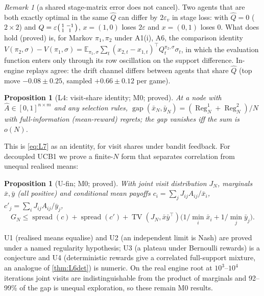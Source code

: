\documentclass[10pt]{article}
\theoremstyle{plain}
\newtheorem{proposition}[theorem]{Proposition}
\theoremstyle{definition}
\theoremstyle{remark}
\newtheorem{remark}[theorem]{Remark}
\newcommand{\E}{\mathbb{E}}
\DeclareMathOperator{\TV}{TV}
\DeclareMathOperator{\spread}{spread}
\DeclareMathOperator{\Reg}{Reg}
\DeclareMathOperator{\NashGap}{gap}
\newcommand{\epsv}{\varepsilon_v}
\newcommand{\Qhat}{\hat Q}
\newcommand{\Ahat}{\hat A}
\begin{document}
\begin{remark}[a shared stage-matrix error does not cancel]\label{rem:nocancel}
Two agents that are both exactly optimal in the same $\Qhat$ can differ by $2\epsv$ in stage loss: with $\Qhat=0$ ($2\times2$)
and $Q=\varepsilon\begin{psmallmatrix}1&-1\\1&1\end{psmallmatrix}$, $x=(1,0)$ loses $2\varepsilon$ and $x=(0,1)$ loses 0. What does
hold (proved) is, for Markov $\pi_1,\pi_2$ under A1(i), A6, the comparison identity $V(\pi_2,\sigma)-V(\pi_1,\sigma)=\E_{\pi_1,\sigma}\sum_t(x_{2,t}-x_{1,t})^\top Q^{\pi_2,\sigma}_t\sigma_t$,
in which the evaluation function enters only through its row oscillation on the support difference. In-engine replays agree: the drift
channel differs between agents that share $\Qhat$ (top move $-0.08\pm0.25$, sampled $+0.66\pm0.12$ per game).
\end{remark}

\begin{proposition}[L4: visit-share identity; M0; proved]\label{prop:L4}
At a node with $\Ahat\in[0,1]^{n\times m}$ and any selection rules,
$\NashGap(\bar x_N,\bar y_N)=(\Reg^1_N+\Reg^2_N)/N$ with full-information (mean-reward) regrets; the gap vanishes iff
the sum is $o(N)$.
\end{proposition}
This is \cref{eq:L7} as an identity, for visit shares under bandit feedback. For decoupled UCB1 we prove a finite-$N$
form that separates correlation from unequal realised means:
\begin{proposition}[U-fin; M0; proved]\label{prop:Ufin}
With joint visit distribution $J_N$, marginals $\bar x,\bar y$ (all positive) and conditional mean payoffs
$c_i=\sum_jJ_{ij}A_{ij}/\bar x_i$, $c'_j=\sum_iJ_{ij}A_{ij}/\bar y_j$,
\[G_N\le\spread(c)+\spread(c')+\TV(J_N,\bar x\bar y^\top)\big(1/\min_i\bar x_i+1/\min_j\bar y_j\big).\]
\end{proposition}
U1 (realised means equalise) and U2 (an independent limit is Nash) are proved under a named regularity hypothesis;
U3 (a plateau under Bernoulli rewards) is a conjecture and U4 (deterministic rewards give a correlated full-support
mixture, an analogue of \cref{thm:L6det}) is numeric. On the real engine root at $10^3$--$10^4$ iterations joint visits
are indistinguishable from the product of marginals and 92--99\% of the gap is unequal exploration, so these remain M0
results.
\end{document}
